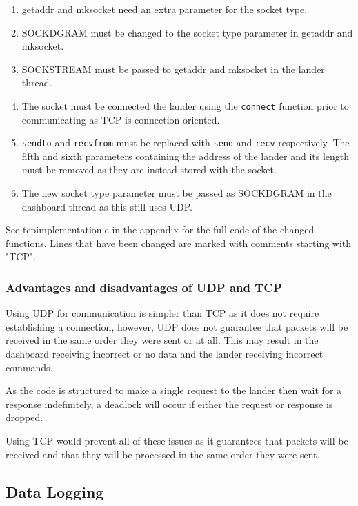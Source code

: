 \documentclass{article}
\newcommand{\code}[1]{\texttt{#1}}
\begin{document}
{    \begin{enumerate}
        \item getaddr and mksocket need an extra parameter for the socket type.
        \item SOCK\textunderscore DGRAM must be changed to the socket type
              parameter in getaddr and mksocket.
        \item SOCK\textunderscore STREAM must be passed to getaddr and mksocket in the lander thread.
        \item The socket must be connected the lander using the \code{connect}
              function prior to communicating as TCP is connection oriented.
        \item \code{sendto} and \code{recvfrom} must be replaced with \code{send}
              and \code{recv} respectively. The fifth and sixth parameters containing
              the address of the lander and its length must be removed as they are
              instead stored with the socket.
        \item The new socket type parameter must be passed as SOCK\textunderscore DGRAM in
              the dashboard thread as this still uses UDP.
    \end{enumerate}

    See tcp\textunderscore implementation.c in the appendix for the full
    code of the changed functions. Lines that have been changed are marked
    with comments starting with "TCP".

    \subsubsection{Advantages and disadvantages of UDP and TCP}
    Using UDP for communication is simpler than TCP as it does not require establishing a connection,
    however, UDP does not guarantee that packets will be received in the same
    order they were sent or at all. This may result in the dashboard receiving
    incorrect or no data and the lander receiving incorrect commands.

    As the code is structured to make a single request to the lander then
    wait for a response indefinitely, a deadlock will occur if either the
    request or response is dropped.

    Using TCP would prevent all of these issues as it guarantees that packets
    will be received and that they will be processed in the same order they
    were sent.

    \subsection{Data Logging}

}
\end{document}
